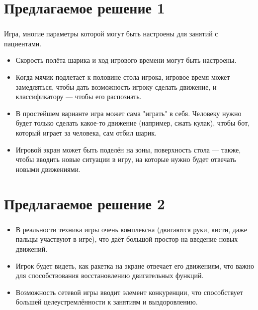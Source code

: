 \section{Предлагаемое решение 1}

\begin{frame}
\frametitle{\insertsection} 
\framesubtitle{\insertsubsection}
Игра, многие параметры которой могут быть настроены для занятий с пациентами.
    \begin{itemize}
        \item Скорость полёта шарика и ход игрового времени могут быть настроены.
        
        \item Когда мячик подлетает к половине стола игрока, игровое время может замедляться, чтобы дать возможность игроку сделать движение, и классификатору --- чтобы его распознать.
        
        \item  В простейшем варианте игра может сама "играть" в себя. Человеку нужно будет только сделать какое-то движение (например, сжать кулак), чтобы бот, который играет за человека, сам отбил шарик.
        
        \item Игровой экран может быть поделён на зоны, поверхность стола --- также, чтобы вводить новые ситуации в игру, на которые нужно будет отвечать новыми движениями.
    \end{itemize}
\end{frame}

\section{Предлагаемое решение 2}

\begin{frame}
\frametitle{\insertsection} 
\framesubtitle{\insertsubsection}
    \begin{itemize}
        \item В реальности техника игры очень комплексна (двигаются руки, кисти, даже пальцы участвуют в игре), что даёт большой простор на введение новых движений.
        
        \item Игрок будет видеть, как ракетка на экране отвечает его движениям, что важно для способствования восстановлению двигательных функций.
        
        \item Возможность сетевой игры вводит элемент конкуренции, что способствует большей целеустремлённости к занятиям и выздоровлению.
    \end{itemize}
\end{frame}

